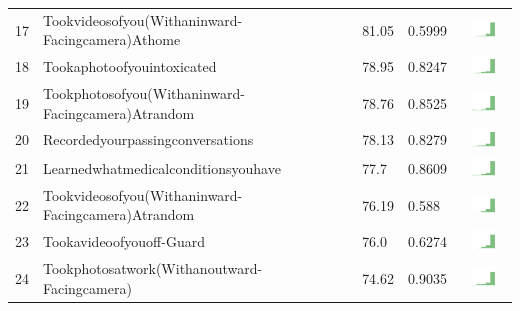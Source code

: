 \documentclass[a4paper,12pt]{article}
\begin{document}
\begin{longtable}{| p{0.5cm} | p{7cm} | p{1cm} |p{1cm} | c |}
17 & Tookvideosofyou(Withaninward-Facingcamera)Athome & 81.05&0.5999 & \includegraphics[width = 2cm, height = 0.5cm]{tables/tookvideosofyou(withaninward-facingcamera)athomecombined} \\ 
18 & Tookaphotoofyouintoxicated & 78.95&0.8247 & \includegraphics[width = 2cm, height = 0.5cm]{tables/tookaphotoofyouintoxicatedcombined} \\ 
19 & Tookphotosofyou(Withaninward-Facingcamera)Atrandom & 78.76&0.8525 & \includegraphics[width = 2cm, height = 0.5cm]{tables/tookphotosofyou(withaninward-facingcamera)atrandomcombined} \\ 
20 & Recordedyourpassingconversations & 78.13&0.8279 & \includegraphics[width = 2cm, height = 0.5cm]{tables/recordedyourpassingconversationscombined} \\ 
21 & Learnedwhatmedicalconditionsyouhave & 77.7&0.8609 & \includegraphics[width = 2cm, height = 0.5cm]{tables/learnedwhatmedicalconditionsyouhavecombined} \\ 
22 & Tookvideosofyou(Withaninward-Facingcamera)Atrandom & 76.19&0.588 & \includegraphics[width = 2cm, height = 0.5cm]{tables/tookvideosofyou(withaninward-facingcamera)atrandomcombined} \\ 
23 & Tookavideoofyouoff-Guard & 76.0&0.6274 & \includegraphics[width = 2cm, height = 0.5cm]{tables/tookavideoofyouoff-guardcombined} \\ 
24 & Tookphotosatwork(Withanoutward-Facingcamera) & 74.62&0.9035 & \includegraphics[width = 2cm, height = 0.5cm]{tables/tookphotosatwork(withanoutward-facingcamera)combined} \\ 

\end{longtable}
\end{document}
